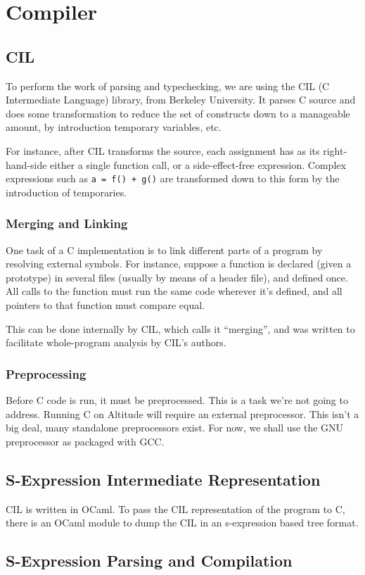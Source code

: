 \chapter{Compiler}
\section{CIL}
To perform the work of parsing and typechecking, we are using the CIL (C Intermediate Language) library, from Berkeley University. It parses C source and does some transformation to reduce the set of constructs down to a manageable amount, by introduction temporary variables, etc.

For instance, after CIL transforms the source, each assignment has as its right-hand-side either a single function call, or a side-effect-free expression. Complex expressions such as {\tt a = f() + g()} are transformed down to this form by the introduction of temporaries.

\subsection{Merging and Linking}

One task of a C implementation is to link different parts of a program by resolving external symbols. For instance, suppose a function is declared (given a prototype) in several files (usually by means of a header file), and defined once. All calls to the function must run the same code wherever it's defined, and all pointers to that function must compare equal.

This can be done internally by CIL, which calls it ``merging'', and was written to facilitate whole-program analysis by CIL's authors.

\subsection{Preprocessing}
Before C code is run, it must be preprocessed. This is a task we're not going to address. Running C on Altitude will require an external preprocessor. This isn't a big deal, many standalone preprocessors exist. For now, we shall use the GNU preprocessor as packaged with GCC.

\section{S-Expression Intermediate Representation}

CIL is written in OCaml. To pass the CIL representation of the program to C, there is an OCaml module to dump the CIL in an s-expression based tree format.

\section{S-Expression Parsing and Compilation}